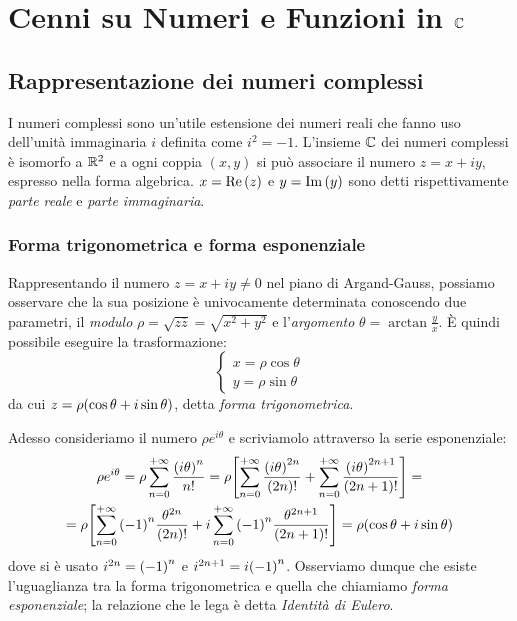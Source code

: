 \chapter{Cenni su Numeri e Funzioni in $\mathbb{C}$}\label{app:A}
\section{Rappresentazione dei numeri complessi}
    I numeri complessi sono un'utile estensione dei numeri reali che fanno uso dell'unit\`a immaginaria $i$ definita come $i^2=-1$. L'insieme $\mathbb{C}$ dei numeri complessi \`e isomorfo a $\mathbb{R}^2$ e a ogni coppia $(x,y)$ si pu\`o associare il numero $z=x+iy$, espresso nella forma algebrica. $x=\Re\qty(z)$ e $y=\Im\qty(y)$ sono detti rispettivamente \emph{parte reale} e \emph{parte immaginaria}.
    \subsection{Forma trigonometrica e forma esponenziale}
        Rappresentando il numero $z=x+iy\neq 0$ nel piano di Argand-Gauss, possiamo osservare che la sua posizione \`e univocamente determinata conoscendo due parametri, il \emph{modulo} $\rho=\sqrt{z\overline{z}}=\sqrt{x^2+y^2}$ e l'\emph{argomento} $\displaystyle\theta=\arctan{\frac{y}{x}}$. \`E quindi possibile eseguire la trasformazione:
        \begin{equation*}
        \begin{cases}
            x=\rho\cos\theta\\
            y=\rho\sin\theta
        \end{cases}
        \end{equation*}
        da cui $z=\rho\qty(\cos\theta+i\sin\theta)$, detta \emph{forma trigonometrica}. \par Adesso consideriamo il numero $\rho e^{i\theta}$ e scriviamolo attraverso la serie esponenziale: 
        \begin{multline*}
            \rho e^{i\theta}=\rho\sum_{n=0}^{+\infty}\frac{\qty(i\theta)^n}{n!}=\rho\qty[\sum_{n=0}^{+\infty}\frac{\qty(i\theta)^{2n}}{\qty(2n)!}+\sum_{n=0}^{+\infty}\frac{\qty(i\theta)^{2n+1}}{\qty(2n+1)!}]=\\ =\rho\qty[\sum_{n=0}^{+\infty}\qty(-1)^n\frac{\theta^{2n}}{\qty(2n)!}+i\sum_{n=0}^{+\infty}\qty(-1)^n\frac{\theta^{2n+1}}{\qty(2n+1)!}]=\rho\qty(\cos\theta+i\sin\theta)
        \end{multline*}    
        dove si \`e usato $i^{2n}=\qty(-1)^n$ e $i^{2n+1}=i\qty(-1)^n$. Osserviamo dunque che esiste l'uguaglianza tra la forma trigonometrica e quella che chiamiamo \emph{forma esponenziale}; la relazione che le lega \`e detta \emph{Identit\`a di Eulero}.

